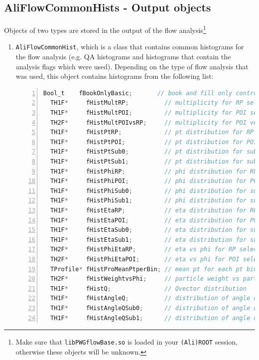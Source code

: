 \documentclass[a4paper]{book}
\numberwithin{equation}{subsection}
\begin{document}
\subsection{AliFlowCommonHists - Output objects}\label{sec:commonhists}
Objects of two types are stored in the output of the flow analysis\footnote{Make sure that \texttt{libPWGflowBase.so} is loaded in your \texttt{(Ali)ROOT} session, otherwise these objects will be unknown.}
\begin{enumerate}
\item \texttt{AliFlowCommonHist}, which is a class that contains common histograms for the flow analysis (e.g. QA histograms and histograms that contain the analysis flags which were used). Depending on the type of flow analysis that was used, this object contains histograms from the following list:
\begin{lstlisting}[language=C, numbers=left]
  Bool_t    fBookOnlyBasic;       // book and fill only control histos needed for all methods
  TH1F*     fHistMultRP;          // multiplicity for RP selection
  TH1F*     fHistMultPOI;         // multiplicity for POI selection
  TH2F*     fHistMultPOIvsRP;     // multiplicity for POI versus RP
  TH1F*     fHistPtRP;            // pt distribution for RP selection
  TH1F*     fHistPtPOI;           // pt distribution for POI selection
  TH1F*     fHistPtSub0;          // pt distribution for subevent 0
  TH1F*     fHistPtSub1;          // pt distribution for subevent 1
  TH1F*     fHistPhiRP;           // phi distribution for RP selection
  TH1F*     fHistPhiPOI;          // phi distribution for POI selection
  TH1F*     fHistPhiSub0;         // phi distribution for subevent 0
  TH1F*     fHistPhiSub1;         // phi distribution for subevent 1
  TH1F*     fHistEtaRP;           // eta distribution for RP selection
  TH1F*     fHistEtaPOI;          // eta distribution for POI selection
  TH1F*     fHistEtaSub0;         // eta distribution for subevent 0
  TH1F*     fHistEtaSub1;         // eta distribution for subevent 1
  TH2F*     fHistPhiEtaRP;        // eta vs phi for RP selection
  TH2F*     fHistPhiEtaPOI;       // eta vs phi for POI selection
  TProfile* fHistProMeanPtperBin; // mean pt for each pt bin (for POI selection)
  TH2F*     fHistWeightvsPhi;     // particle weight vs particle phi
  TH1F*     fHistQ;               // Qvector distribution
  TH1F*     fHistAngleQ;          // distribution of angle of Q vector
  TH1F*     fHistAngleQSub0;      // distribution of angle of subevent 0 Q vector
  TH1F*     fHistAngleQSub1;      // distribution of angle of subevent 1 Q vector

\end{lstlisting}
\end{enumerate}
\end{document}
